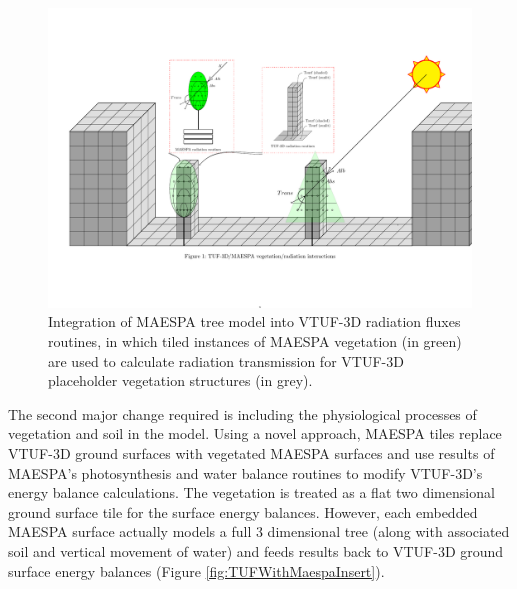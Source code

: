 \documentclass[final,3p,times,authoryear]{elsarticle}
\begin{document}
\begin{figure}[!htbp]
 \includegraphics[trim = 15mm 41mm 0mm 31mm, clip, scale=0.45]{images/TUFWithMaespaVegRadiation.pdf}  
 \caption{Integration of MAESPA tree model into VTUF-3D radiation fluxes routines, in which tiled instances of MAESPA vegetation (in green) are used to calculate radiation transmission for VTUF-3D placeholder vegetation structures (in grey)\label{fig:TUFWithMaespaVegRadiation}.}
\end{figure}

The second major change required is including the physiological processes of vegetation and soil in the model. Using a novel approach, MAESPA tiles replace VTUF-3D ground surfaces with vegetated MAESPA surfaces and use results of MAESPA’s photosynthesis and water balance routines to modify VTUF-3D's energy balance calculations. The vegetation is treated as a flat two dimensional ground surface tile for the surface energy balances. However, each embedded MAESPA surface actually models a full 3 dimensional tree (along with associated soil and vertical movement of water) and feeds results back to VTUF-3D ground surface energy balances (Figure \ref{fig:TUFWithMaespaInsert}).

\end{document}
